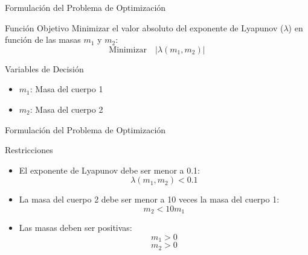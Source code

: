 \begin{frame}{Formulación del Problema de Optimización}

\begin{block}{Función Objetivo}
  Minimizar el valor absoluto del exponente de Lyapunov ($\lambda$) en función de las masas $m_1$ y $m_2$:
  $$ \text{Minimizar} \quad |\lambda(m_1, m_2)| $$
\end{block}

\begin{block}{Variables de Decisión}
  \begin{itemize}
      \item $m_1$: Masa del cuerpo 1
      \item $m_2$: Masa del cuerpo 2
  \end{itemize}
\end{block}
\end{frame}

\begin{frame}{Formulación del Problema de Optimización}
\begin{block}{Restricciones}
  \begin{itemize}
      \item El exponente de Lyapunov debe ser menor a 0.1:
      $$ \lambda(m_1, m_2) < 0.1 $$
      \item La masa del cuerpo 2 debe ser menor a 10 veces la masa del cuerpo 1:
      $$ m_2 < 10 m_1 $$
      \item Las masas deben ser positivas:
      $$ m_1 > 0 $$
      $$ m_2 > 0 $$
  \end{itemize}
\end{block}

\end{frame}